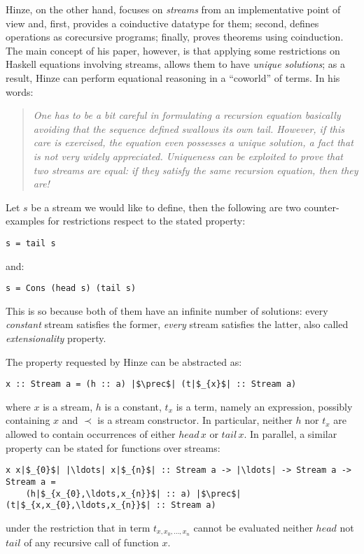 Hinze, on the other hand, focuses on \emph{streams} from an implementative 
point of view and, first, provides a coinductive
datatype for them; second, defines operations as corecursive programs; finally,
proves theorems using coinduction. The main concept of his paper, however, is that
applying some restrictions on Haskell equations involving streams, allows them
to have \emph{unique solutions}; as a result, Hinze can perform equational
reasoning in a ``coworld'' of terms. In his words:
\begin{quote}
\textit{One has to be a bit careful in formulating a recursion equation 
basically avoiding that the sequence
defined swallows its own tail. However, if this care is exercised,
the equation even possesses a unique solution, a fact that is not
very widely appreciated. Uniqueness can be exploited to prove that
two streams are equal: if they satisfy the same recursion equation,
then they are!}
\end{quote}
Let $s$ be a stream we would like to define, then the following are 
two counter-examples for restrictions respect to the stated property:
\begin{verbatim}
s = tail s
\end{verbatim}
and:
\begin{verbatim}
s = Cons (head s) (tail s)
\end{verbatim}
This is so because both of them have an infinite number of solutions:
every \emph{constant} stream satisfies the former, \emph{every} 
stream satisfies the latter, also called \emph{extensionality}
property. 

The property requested by Hinze can be abstracted as:
\begin{verbatim}
x :: Stream a = (h :: a) |$\prec$| (t|$_{x}$| :: Stream a)
\end{verbatim}
where $x$ is a stream, $h$ is a constant, $t_{x}$ is a term,
namely an expression, possibly containing $x$ and $\prec$ is
a stream constructor. 
In particular, neither $h$ nor $t_{x}$ are allowed to contain occurrences of
either $head\,x$ or $tail\,x$.
In parallel, a similar property can be stated for functions over streams:
\begin{verbatim}
x x|$_{0}$| |\ldots| x|$_{n}$| :: Stream a -> |\ldots| -> Stream a -> Stream a = 
    (h|$_{x_{0},\ldots,x_{n}}$| :: a) |$\prec$| (t|$_{x,x_{0},\ldots,x_{n}}$| :: Stream a)
\end{verbatim}
under the restriction that in term $t_{x,x_{0},\ldots,x_{n}}$ cannot be evaluated neither $head$
not $tail$ of any recursive call of function $x$.

